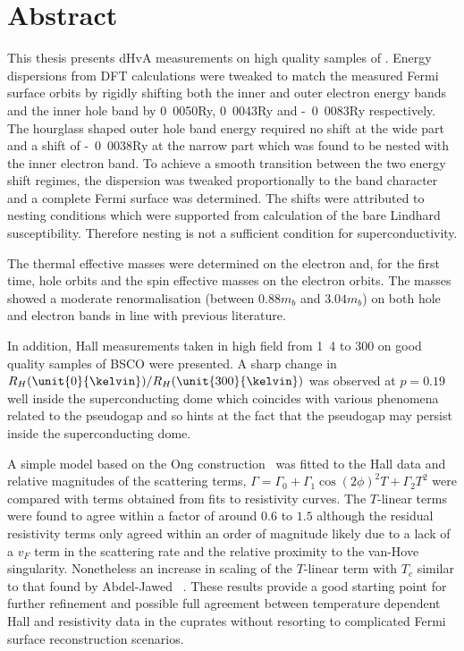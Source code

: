 \thispagestyle{empty}\null\clearpage

\setcounter{page}{1}


\section*{Abstract}


This thesis presents \ac{dHvA} measurements on high quality samples of \BaFeP{}. Energy dispersions from \ac{DFT} calculations were tweaked to match the measured Fermi surface orbits by rigidly shifting both the inner and outer electron energy bands and the inner hole band by \unit{0.0050}{\textrm{Ry}}, \unit{0.0043}{\textrm{Ry}} and \unit{-0.0083}{\textrm{Ry}} respectively. The hourglass shaped outer hole band energy required no shift at the wide part and a shift of \unit{-0.0038}{\textrm{Ry}} at the narrow part which was found to be nested with the inner electron band. To achieve a smooth transition between the two energy shift regimes, the dispersion was tweaked proportionally to the \DzTwo{} band character and a complete Fermi surface was determined. The shifts were attributed to nesting conditions which were supported from calculation of the bare Lindhard susceptibility. Therefore nesting is not a sufficient condition for superconductivity.

The thermal effective masses were determined on the electron and, for the first time, hole orbits and the spin effective masses on the electron orbits. The masses showed a moderate renormalisation (between $\unit{0.88}{m_b}$ and $\unit{3.04}{m_b}$) on both hole and electron bands in line with previous literature.

In addition, Hall measurements taken in high field from \unit{1.4}{\kelvin} to \unit{300}{\kelvin} on good quality samples of \ac{BSCO} were presented. A sharp change in $R_H(\unit{0}{\kelvin})/R_H(\unit{300}{\kelvin})$ was observed at $p=0.19$ well inside the superconducting dome which coincides with various phenomena related to the pseudogap and so hints at the fact that the pseudogap may persist inside the superconducting dome.

A simple model based on the Ong construction~\cite{Ong1991} was fitted to the Hall data and relative magnitudes of the scattering terms, $\Gamma = \Gamma_0 + \Gamma_1 \cos(2\phi)^2 T + \Gamma_2 T^2$ were compared with terms obtained from fits to resistivity curves. The $T$-linear terms were found to agree within a factor of around $0.6$ to $1.5$ although the residual resistivity terms only agreed within an order of magnitude likely due to a lack of a $v_F$ term in the scattering rate and the relative proximity to the van-Hove singularity. Nonetheless an increase in scaling of the $T$-linear term with $T_c$ similar to that found by Abdel-Jawed \etal~\cite{Abdel-Jawad2007}. These results provide a good starting point for further refinement and possible full agreement between temperature dependent Hall and resistivity data in the cuprates without resorting to complicated Fermi surface reconstruction scenarios.

